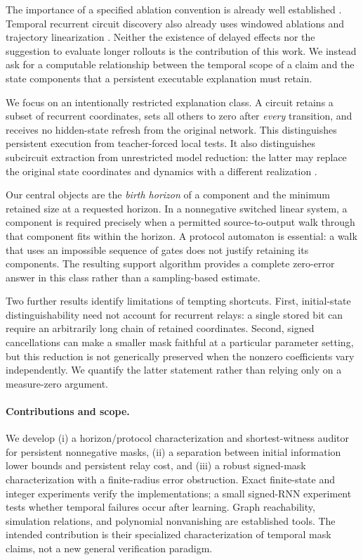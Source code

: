 \documentclass[11pt]{article}
\theoremstyle{definition}\newtheorem{definition}[theorem]{Definition}
\begin{document}
The importance of a specified ablation convention is already well established \citep{miller2024}. Temporal recurrent circuit discovery also already uses windowed ablations and trajectory linearization \citep{balwani}. Neither the existence of delayed effects nor the suggestion to evaluate longer rollouts is the contribution of this work. We instead ask for a computable relationship between the temporal scope of a claim and the state components that a persistent executable explanation must retain.

We focus on an intentionally restricted explanation class. A circuit retains a subset of recurrent coordinates, sets all others to zero after \emph{every} transition, and receives no hidden-state refresh from the original network. This distinguishes persistent execution from teacher-forced local tests. It also distinguishes subcircuit extraction from unrestricted model reduction: the latter may replace the original state coordinates and dynamics with a different realization \citep{cortese2025}.

Our central objects are the \emph{birth horizon} of a component and the minimum retained size at a requested horizon. In a nonnegative switched linear system, a component is required precisely when a permitted source-to-output walk through that component fits within the horizon. A protocol automaton is essential: a walk that uses an impossible sequence of gates does not justify retaining its components. The resulting support algorithm provides a complete zero-error answer in this class rather than a sampling-based estimate.

Two further results identify limitations of tempting shortcuts. First, initial-state distinguishability need not account for recurrent relays: a single stored bit can require an arbitrarily long chain of retained coordinates. Second, signed cancellations can make a smaller mask faithful at a particular parameter setting, but this reduction is not generically preserved when the nonzero coefficients vary independently. We quantify the latter statement rather than relying only on a measure-zero argument.

\paragraph{Contributions and scope.} We develop (i) a horizon/protocol characterization and shortest-witness auditor for persistent nonnegative masks, (ii) a separation between initial information lower bounds and persistent relay cost, and (iii) a robust signed-mask characterization with a finite-radius error obstruction. Exact finite-state and integer experiments verify the implementations; a small signed-RNN experiment tests whether temporal failures occur after learning. Graph reachability, simulation relations, and polynomial nonvanishing are established tools. The intended contribution is their specialized characterization of temporal mask claims, not a new general verification paradigm.
\end{document}
